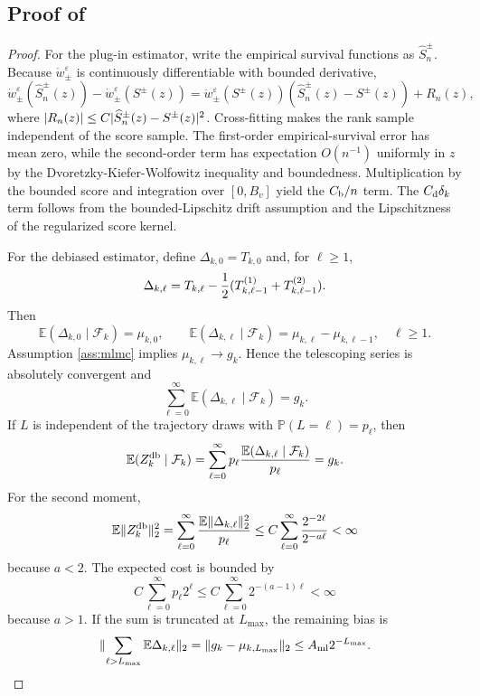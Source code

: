 \documentclass[11pt]{article}
\newcommand{\E}{\mathbb E}
\newcommand{\Pp}{\mathbb P}
\newcommand{\1}{\mathbf 1}
\DeclarePairedDelimiter{\abs}{\lvert}{\rvert}
\DeclarePairedDelimiter{\norm}{\lVert}{\rVert}
\newcommand{\cF}{\mathcal F}
\newcommand{\eps}{\varepsilon}
\newcommand{\db}{\mathrm{db}}
\begin{document}
\subsection{Proof of }
\begin{proof}
For the plug-in estimator, write the empirical survival functions as $\widehat S_n^\pm$.  Because $\dot w_\pm^\eps$ is continuously differentiable with bounded derivative,
\[
 \dot w_\pm^\eps(\widehat S_n^\pm(z))-\dot w_\pm^\eps(S^\pm(z))
 =\ddot w_\pm^\eps(S^\pm(z))(\widehat S_n^\pm(z)-S^\pm(z))+R_n(z),
\]
where $\abs{R_n(z)}\le C\abs{\widehat S_n^\pm(z)-S^\pm(z)}^2$.  Cross-fitting makes the rank sample independent of the score sample.  The first-order empirical-survival error has mean zero, while the second-order term has expectation $O(n^{-1})$ uniformly in $z$ by the Dvoretzky-Kiefer-Wolfowitz inequality and boundedness.  Multiplication by the bounded score and integration over $[0,B_v]$ yield the $C_{\rm b}/n$ term.  The $C_{\rm d}\delta_k$ term follows from the bounded-Lipschitz drift assumption and the Lipschitzness of the regularized score kernel.

For the debiased estimator, define $\Delta_{k,0}=T_{k,0}$ and, for $\ell\ge1$,
\[
 \Delta_{k,\ell}=T_{k,\ell}-{1\over2}(T_{k,\ell-1}^{(1)}+T_{k,\ell-1}^{(2)}).
\]
Then
\[
 \E(\Delta_{k,0}\mid\cF_k)=\mu_{k,0},\qquad
 \E(\Delta_{k,\ell}\mid\cF_k)=\mu_{k,\ell}-\mu_{k,\ell-1},\quad \ell\ge1.
\]
Assumption \ref{ass:mlmc} implies $\mu_{k,\ell}\to g_k$.  Hence the telescoping series is absolutely convergent and
\[
 \sum_{\ell=0}^{\infty}\E(\Delta_{k,\ell}\mid\cF_k)=g_k.
\]
If $L$ is independent of the trajectory draws with $\Pp(L=\ell)=p_\ell$, then
\[
 \E(Z_k^{\db}\mid\cF_k)
 =\sum_{\ell=0}^{\infty}p_\ell {\E(\Delta_{k,\ell}\mid\cF_k)\over p_\ell}=g_k.
\]
For the second moment,
\[
 \E\norm{Z_k^{\db}}_2^2
 =\sum_{\ell=0}^{\infty}{\E\norm{\Delta_{k,\ell}}_2^2\over p_\ell}
 \le C\sum_{\ell=0}^{\infty}{2^{-2\ell}\over 2^{-a\ell}}<\infty
\]
because $a<2$.  The expected cost is bounded by
\[
 C\sum_{\ell=0}^{\infty}p_\ell 2^\ell
 \le C\sum_{\ell=0}^{\infty}2^{-(a-1)\ell}<\infty
\]
because $a>1$.  If the sum is truncated at $L_{\max}$, the remaining bias is
\[
 \norm{\sum_{\ell>L_{\max}}\E\Delta_{k,\ell}}_2
 =\norm{g_k-\mu_{k,L_{\max}}}_2\le A_{\rm ml}2^{-L_{\max}}.
\]
\end{proof}
\end{document}
